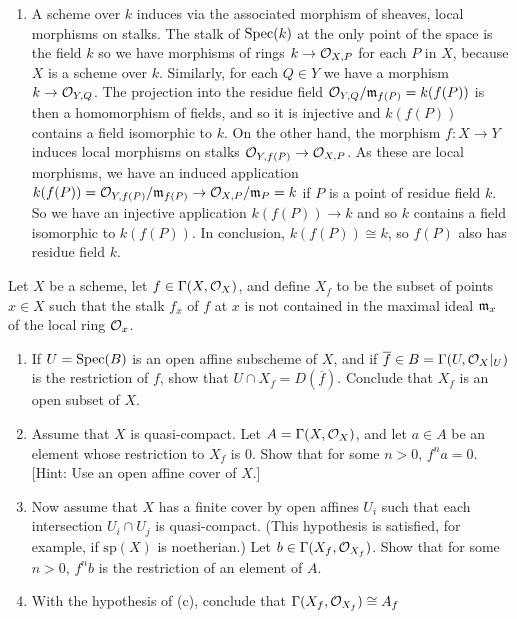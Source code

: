\begin{sol}
\begin{enumerate}[label=\alph*)]
		\item A scheme over $k$ induces via the associated morphism of sheaves, local morphisms on stalks. The stalk of $\mathrm{Spec}(k)$ at the only point of the space is the field $k$ so we have morphisms of rings $k \to \mathcal{O}_{X,P}$ for each $P$ in $X$, because $X$ is a scheme over $k$. Similarly, for each $Q \in Y$ we have a morphism $k \to \mathcal{O}_{Y,Q}$. The projection into the residue field $\mathcal{O}_{Y,Q}/\mathfrak{m}_{f(P)} = k(f(P))$ is then a homomorphism of fields, and so it is injective and $k(f(P))$ contains a field isomorphic to $k$. On the other hand, the morphism $f: X \to Y$ induces local morphisms on stalks $\mathcal{O}_{Y, f(P)} \to \mathcal{O}_{X,P}$. As these are local morphisms, we have an induced application $k(f(P)) = \mathcal{O}_{Y,f(P)}/\mathfrak{m}_{f(P)} \to \mathcal{O}_{X,P}/\mathfrak{m}_P = k$ if $P$ is a point of residue field $k$. So we have an injective application $k(f(P)) \to k$ and so $k$ contains a field isomorphic to $k(f(P))$. In conclusion, $k(f(P)) \cong k$, so $f(P)$ also has residue field $k$.
	\end{enumerate}
\end{sol}



\begin{ex}
	Let $X$ be a scheme, let $f \in \Gamma(X, \mathcal{O}_X)$, and define $X_f$ to be the subset of points $x \in X$ such that the stalk $f_x$ of $f$ at $x$ is not contained in the maximal ideal $\mathfrak{m}_x$ of the local ring $\mathcal{O}_x$.
	\begin{enumerate}[label=\alph*)]
		\item If $U = \mathrm{Spec}(B)$ is an open affine subscheme of $X$, and if $\overline{f} \in B = \Gamma(U, \mathcal{O}_X|_U)$ is the restriction of $f$, show that $U \cap X_f = D(\overline{f})$. Conclude that $X_f$ is an open subset of $X$.

		\item Assume that $X$ is quasi-compact. Let $A = \Gamma(X, \mathcal{O}_X)$, and let $a \in A$ be an element whose restriction to $X_f$ is $0$. Show that for some $n > 0, \, f^n a = 0$. [Hint: Use an open affine cover of $X$.]

		\item Now assume that $X$ has a finite cover by open affines $U_i$ such that each intersection $U_i \cap U_j$ is quasi-compact. (This hypothesis is satisfied, for example, if $\mathrm{sp}(X)$ is noetherian.) Let $b \in \Gamma(X_f, \mathcal{O}_{X_f})$. Show that for some $n > 0, \, f^n b$ is the restriction of an element of $A$.

		\item With the hypothesis of (c), conclude that $\Gamma(X_f, \mathcal{O}_{X_f}) \cong A_f$
	\end{enumerate}
\end{ex}

